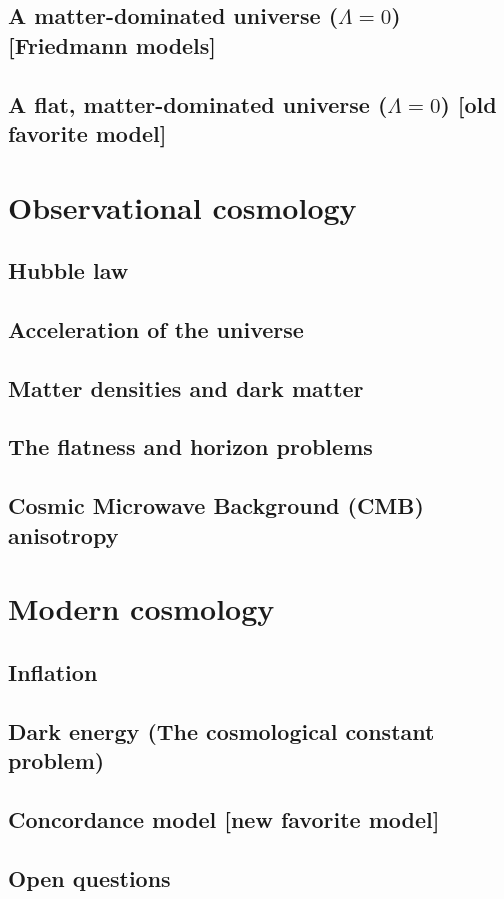 \documentclass{book}
\theoremstyle{definition}
\begin{document}
\subsection{A matter-dominated universe ($\Lambda = 0$) [Friedmann models]}
\subsection{A flat, matter-dominated universe ($\Lambda = 0$) [old favorite model]}
\section{Observational cosmology}
\subsection{Hubble law}
\subsection{Acceleration of the universe}
\subsection{Matter densities and dark matter}
\subsection{The flatness and horizon problems}
\subsection{Cosmic Microwave Background (CMB) anisotropy}
\section{Modern cosmology}
\subsection{Inflation}
\subsection{Dark energy (The cosmological constant problem)}
\subsection{Concordance model [new favorite model]}
\subsection{Open questions}

\newpage
 
\end{document}
